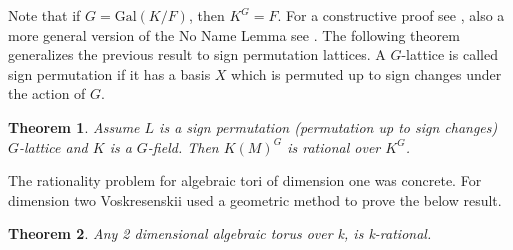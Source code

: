 \documentclass[a4paper, 14pt]{extarticle}
\theoremstyle{plain}
\newtheorem{theorem}{Theorem}
\theoremstyle{definition}
\newcommand{\Z}{\ensuremath{\mathbb{Z}}}
\newcommand{\G}{G}
\newcommand{\glat}{$G$-lattice}
\begin{document}
\noindent
Note that if $\G = \mathrm{Gal} (K/F)$, then $K^\G = F$. For a constructive proof see 
\cite{JamLemSch2019}, also a more general version of the No Name Lemma see \cite{Domokos}. The following 
theorem generalizes the previous result to sign permutation lattices. A $G$-lattice is called 
sign permutation if it has a basis $X$ which is permuted up to sign changes under the action of $G$.
\begin{theorem}\cite[Proposition 9.5.1]{Lorenz}\label{SignPermRational}
Assume $L$ is a sign permutation (permutation up to sign changes) $G$-lattice and $K$ is a $G$-field. Then $K(M)^G$ 
is rational over $K^G$.
\end{theorem}
\noindent
The rationality problem for algebraic tori of dimension one was concrete. For 
dimension two Voskresenskii used a geometric method to prove the below result. 
\begin{theorem}
\cite{Vos67} Any 2 dimensional algebraic torus over k, is k-rational.
\end{theorem} 
\end{document}
